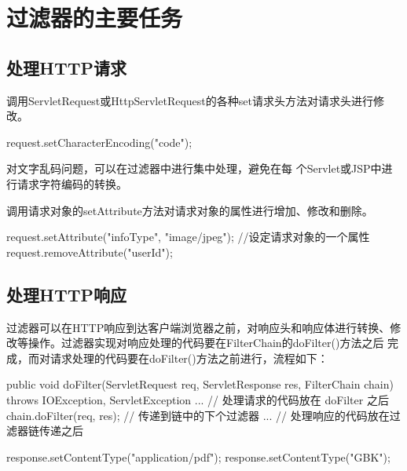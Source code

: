 \section{过滤器的主要任务}

\subsection{处理HTTP请求} 


调用ServletRequest或HttpServletRequest的各种set请求头方法对请求头进行修
改。

\begin{javaCode}
  request.setCharacterEncoding("code");
\end{javaCode}

{\kai 对文字乱码问题，可以在过滤器中进行集中处理，避免在每
  个Servlet或JSP中进行请求字符编码的转换。}


调用请求对象的setAttribute方法对请求对象的属性进行增加、修改和删除。

\begin{javaCode}
  request.setAttribute("infoType", "image/jpeg"); //设定请求对象的一个属性
  request.removeAttribute("userId");
\end{javaCode}

\subsection{处理HTTP响应} 

过滤器可以在HTTP响应到达客户端浏览器之前，对响应头和响应体进行转换、修
改等操作。过滤器实现对响应处理的代码要在FilterChain的doFilter()方法之后
完成，而对请求处理的代码要在doFilter()方法之前进行，流程如下：

\begin{javaCode}
  public void doFilter(ServletRequest req, ServletResponse res, FilterChain chain) 
  throws IOException, ServletException {
    ...  // 处理请求的代码放在 doFilter 之后
    chain.doFilter(req, res); // 传递到链中的下个过滤器
    ...  // 处理响应的代码放在过滤器链传递之后
  }  
\end{javaCode}


\begin{javaCode}
  response.setContentType("application/pdf");
  response.setContentType("GBK");
\end{javaCode}

